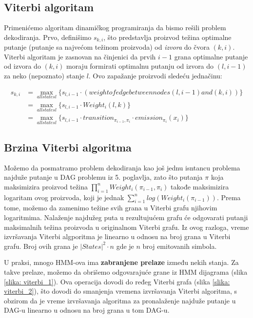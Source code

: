 \subsection{Viterbi algoritam}

Primenićemo algoritam dinamičkog programiranja da bismo rešili problem dekodiranja. Prvo, definišimo $ s_{k, i} $, što predstavlja proizvod težina optimalne putanje (putanje sa najvećom težinom proizvoda) od \textit{izvora} do čvora $ (k, i) $. Viterbi algoritam je zasnovan na činjenici da prvih $ i-1 $ grana optimalne putanje od izvora do $ (k, i) $ moraju formirati optimalnu putanju od izvora do $ (l, i-1) $ za neko (nepoznato) stanje $ l $. Ovo zapažanje proizvodi sledeću jednačinu:

\begin{equation}
\begin{aligned}
    s_{k, i} &= {\displaystyle \max_{all states l} \{s_{l, i-1} \cdot (weight of edge between nodes (l, i-1) and (k, i))\}} \\
    & = \max_{all states l} \{s_{l, i-1} \cdot Weight_i(l, k)\}\\
    & = \max_{all states l} \{s_{l, i-1} \cdot transition_{\pi_{i-1},\pi_i} \cdot emission_{\pi_i}(x_i)\}
\end{aligned}
\end{equation}

\subsection{Brzina Viterbi algoritma}

Možemo da posmatramo problem dekodiranja kao još jednu isntancu problema najduže putanje u DAG problemu iz 5. poglavlja, zato što putanja $ \pi $ koja maksimizira proizvod težina $ {\displaystyle \prod_{i=1}^{n}  Weight_i(\pi_{i-1}, \pi_i)} $ takođe maksimizira logaritam ovog proizvoda,  koji je jednak $ {\displaystyle \sum_{i=1}^{n}  log(Weight_i(\pi_{i-1}))} $. Prema tome, možemo da zamenimo težine svih grana u Viterbi grafu njihovim logaritmima. Nalaženje najdužeg puta u rezultujućem grafu će odgovarati putanji maksimalnih težina proizvoda u originalnom Viterbi grafu. Iz ovog razloga, vreme izvršavanja Viterbi algporitma je linearno u odnosu na broj grana u Viterbi grafu. Broj ovih grana je $ |States|^2 \cdot n $ gde je $ n $ broj emitovanih simbola.

U praksi, mnogo HMM-ova ima \textbf{zabranjene prelaze} između nekih stanja. Za takve prelaze, možemo da obrišemo odgovarajuće grane iz HMM dijagrama (slika \ref{slika: viterbi_1}). Ova operacija dovodi do ređeg Viterbi grafa (slika \ref{slika: viterbi_2}), što dovodi do smanjenja vremena izvršavanja Viterbi algoritma, s obzirom da je vreme izvršavanja algoritma za pronalaženje najduže putanje u DAG-u linearno u odnosu na broj grana u tom DAG-u.

